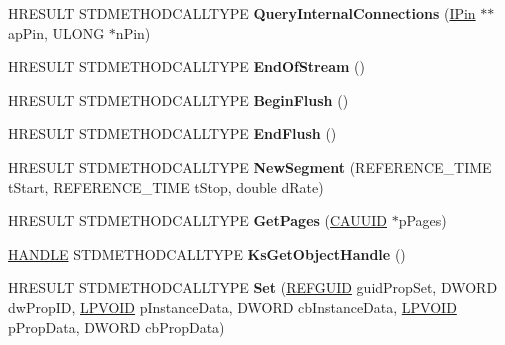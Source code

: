 \begin{DoxyCompactItemize}
\item 
\mbox{\label{class_c_output_pin_a0ee3d73cd53c289b739338974f45e592}} 
H\+R\+E\+S\+U\+LT S\+T\+D\+M\+E\+T\+H\+O\+D\+C\+A\+L\+L\+T\+Y\+PE {\bfseries Query\+Internal\+Connections} (\hyperlink{interface_i_pin}{I\+Pin} $\ast$$\ast$ap\+Pin, U\+L\+O\+NG $\ast$n\+Pin)
\item 
\mbox{\label{class_c_output_pin_ab4f6bb4670f4c8a93ee73d6d73f7d133}} 
H\+R\+E\+S\+U\+LT S\+T\+D\+M\+E\+T\+H\+O\+D\+C\+A\+L\+L\+T\+Y\+PE {\bfseries End\+Of\+Stream} ()
\item 
\mbox{\label{class_c_output_pin_a27643f49442793ad7aeb0e191ffdfb8b}} 
H\+R\+E\+S\+U\+LT S\+T\+D\+M\+E\+T\+H\+O\+D\+C\+A\+L\+L\+T\+Y\+PE {\bfseries Begin\+Flush} ()
\item 
\mbox{\label{class_c_output_pin_ac2d254c97102d05bc72d9359f2853eeb}} 
H\+R\+E\+S\+U\+LT S\+T\+D\+M\+E\+T\+H\+O\+D\+C\+A\+L\+L\+T\+Y\+PE {\bfseries End\+Flush} ()
\item 
\mbox{\label{class_c_output_pin_a580ad2571b2a80e09b43603179e5dcdf}} 
H\+R\+E\+S\+U\+LT S\+T\+D\+M\+E\+T\+H\+O\+D\+C\+A\+L\+L\+T\+Y\+PE {\bfseries New\+Segment} (R\+E\+F\+E\+R\+E\+N\+C\+E\+\_\+\+T\+I\+ME t\+Start, R\+E\+F\+E\+R\+E\+N\+C\+E\+\_\+\+T\+I\+ME t\+Stop, double d\+Rate)
\item 
\mbox{\label{class_c_output_pin_aa1077b3d977219a87029675d321af861}} 
H\+R\+E\+S\+U\+LT S\+T\+D\+M\+E\+T\+H\+O\+D\+C\+A\+L\+L\+T\+Y\+PE {\bfseries Get\+Pages} (\hyperlink{struct_i_specify_property_pages_1_1tag_c_a_u_u_i_d}{C\+A\+U\+U\+ID} $\ast$p\+Pages)
\item 
\mbox{\label{class_c_output_pin_af1355170ba044f75eaec18c8cf0bc069}} 
\hyperlink{interfacevoid}{H\+A\+N\+D\+LE} S\+T\+D\+M\+E\+T\+H\+O\+D\+C\+A\+L\+L\+T\+Y\+PE {\bfseries Ks\+Get\+Object\+Handle} ()
\item 
\mbox{\label{class_c_output_pin_a5aa932e13986fe924b149eefffaecbd0}} 
H\+R\+E\+S\+U\+LT S\+T\+D\+M\+E\+T\+H\+O\+D\+C\+A\+L\+L\+T\+Y\+PE {\bfseries Set} (\hyperlink{struct___g_u_i_d}{R\+E\+F\+G\+U\+ID} guid\+Prop\+Set, D\+W\+O\+RD dw\+Prop\+ID, \hyperlink{interfacevoid}{L\+P\+V\+O\+ID} p\+Instance\+Data, D\+W\+O\+RD cb\+Instance\+Data, \hyperlink{interfacevoid}{L\+P\+V\+O\+ID} p\+Prop\+Data, D\+W\+O\+RD cb\+Prop\+Data)
$$
\end{DoxyCompactItemize}
